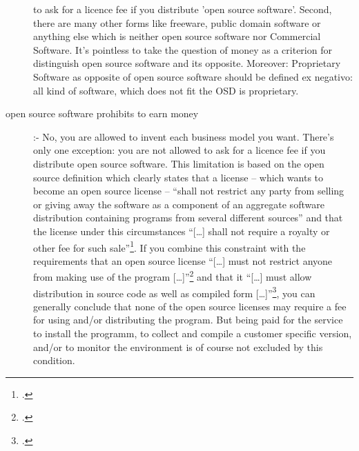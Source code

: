 \begin{description}
  to ask for a licence fee if you distribute 'open source software'. Second,
  there are many other forms like freeware, public domain software or anything
  else which is neither open source software nor Commercial Software. It's
  pointless to take the question of money as a criterion for distinguish open
  source software and its opposite. Moreover: Proprietary Software as opposite
  of open source software should be defined ex negativo: all kind of software,
  which does not fit the OSD is proprietary.
  \item[open source software prohibits to earn money] :- No, you are allowed to
  invent each business model you want. There's only one exception: you are not
  allowed to ask for a licence fee if you distribute open source software. This
  limitation is based on the open source definition which clearly states that a
  license -- which wants to become an open source license -- \enquote{shall not
  restrict any party from selling or giving away the software as a component of
  an aggregate software distribution containing programs from several different
  sources} and that the license under this circumstances \enquote{[\ldots] shall
  not require a royalty or other fee for such sale}\footcite[cf.][§1]{OSI2012a}.
  If you combine this constraint with the requirements that an open source
  license \enquote{[\ldots] must not restrict anyone from making use of the
  program [\ldots]}\footcite[cf.][§6]{OSI2012a} and that it \enquote{[\ldots]
  must allow distribution in source code as well as compiled form
  [\ldots]}\footcite[cf.][§2]{OSI2012a}, you can generally conclude that none of
  the open source licenses may require a fee for using and/or distributing the
  program. But being paid for the service to install the programm, to collect
  and compile a customer specific version, and/or to monitor the environment is
  of course not excluded by this condition.
  

\end{description}
